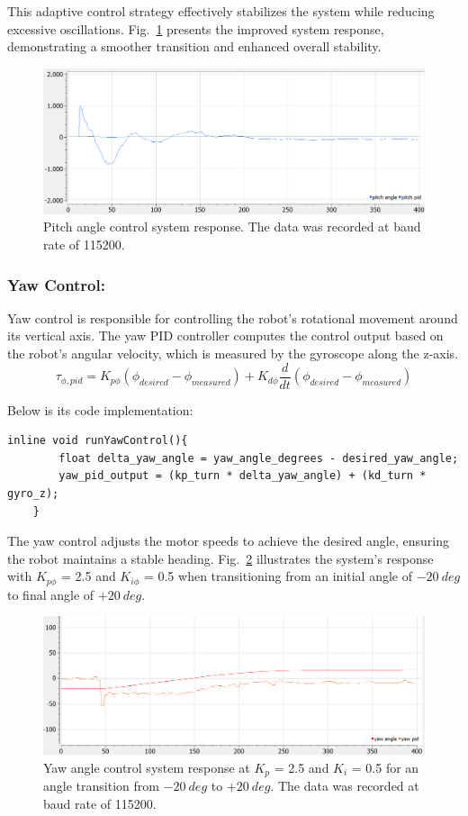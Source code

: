 This adaptive control strategy effectively stabilizes the system while reducing excessive oscillations. Fig.~\ref{fig:pid_position_combined} presents the improved system response, demonstrating a smoother transition and enhanced overall stability.
\begin{figure}[H]
	\centering
	\includegraphics[width=0.8\linewidth]{assets/pid_pitch_combined.png}
	\caption{Pitch angle control system response. The data was recorded at baud rate of 115200.}
	\label{fig:pid_position_combined}
\end{figure}


\subsubsection{Yaw Control:}
Yaw control is responsible for controlling the robot's rotational movement around its vertical axis. The yaw PID controller computes the control output based on the robot's angular velocity, which is measured by the gyroscope along the z-axis. 
\begin{equation}
	\tau_{\phi,pid} = K_{p\phi}(\phi_{desired} - \phi_{measured}) + K_{d\phi}\frac{d}{dt}(\phi_{desired} - \phi_{measured})
\end{equation}

Below is its code implementation:
\begin{lstlisting}[style=cppstyle2]
	inline void runYawControl(){
		float delta_yaw_angle = yaw_angle_degrees - desired_yaw_angle;
		yaw_pid_output = (kp_turn * delta_yaw_angle) + (kd_turn * gyro_z);
	}
\end{lstlisting}

The yaw control adjusts the motor speeds to achieve the desired angle, ensuring the robot maintains a stable heading. Fig.~\ref{fig:pid_yaw} illustrates the system's response with \(K_{p\phi}\) = 2.5 and $K_{i\phi}$ = 0.5 when transitioning from an initial angle of $-20 \ deg$ to final angle of $+20 \ deg$.
\begin{figure}[H]
	\centering
	\includegraphics[width=0.8\linewidth]{assets/pid_yaw_kp_2_5_kd_0_5_target_20_deg.png}
	\caption{Yaw angle control system response at \(K_p\) = 2.5 and $K_i$ = 0.5 for an angle transition from $-20 \ deg$ to $+20 \ deg$. The data was recorded at baud rate of 115200.}
	\label{fig:pid_yaw}
\end{figure}

